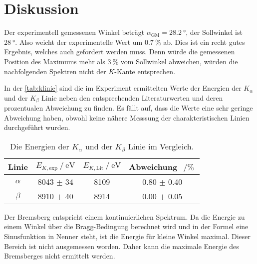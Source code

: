 \section{Diskussion}
\label{sec:Diskussion}

Der experimentell gemessenen Winkel beträgt $\alpha_{\text{GM}} = \SI{28.2}{\degree}$, der Sollwinkel ist $\SI{28}{\degree}$. 
Also weicht der experimentelle Wert um $\SI{0.7}{\percent}$ ab. Dies ist ein recht gutes Ergebnis, welches auch gefordert werden muss. Denn würde die gemessenen
Position des Maximums mehr als $\SI{3}{\percent}$ vom Sollwinkel abweichen, würden die nachfolgenden Spektren nicht der $K$-Kante entsprechen. 

\noindent
In der \autoref{tab:klinie} sind die im Experiment ermittelten Werte der Energien der $K_{\alpha}$ und der $K_{\beta}$ Linie neben den entsprechenden Literaturwerten
und deren prozentualen Abweichung zu finden. Es fällt auf, dass die Werte eine sehr geringe Abweichung haben, obwohl keine nähere Messsung der charakteristischen
Linien durchgeführt wurden.
\begin{table}
    \centering
    \caption{Die Energien der $K_{\alpha}$ und der $K_{\beta}$ Linie im Vergleich.}
    \label{tab:klinie}
    \begin{tabular}{c c c c}
        \toprule
        Linie & $E_{K, \text{exp}} \mathbin{/} \si{\electronvolt} $ & $E_{K, \text{Lit}} \mathbin{/} \si{\electronvolt}$ \cite{E_abs}  & Abweichung $\, \mathbin{/} \si{\percent}$ \\
        \midrule
        $\alpha$ & 8043 $\pm$ 34 & 8109 & 0.80 $\pm$ 0.40 \\ 
        $\beta$  & 8910 $\pm$ 40 & 8914 & 0.00 $\pm$ 0.05 \\  
        \bottomrule      
    \end{tabular}
\end{table}

\noindent Der Bremsberg entspricht einem kontinuierlichen Spektrum. Da die Energie zu einem Winkel über die Bragg-Bedingung berechnet wird und in der Formel 
eine Sinusfunktion in Nenner steht, ist die Energie für kleine Winkel maximal. Dieser Bereich ist nicht ausgemessen worden. Daher kann die maximale Energie des 
Bremsberges nicht ermittelt werden. 


